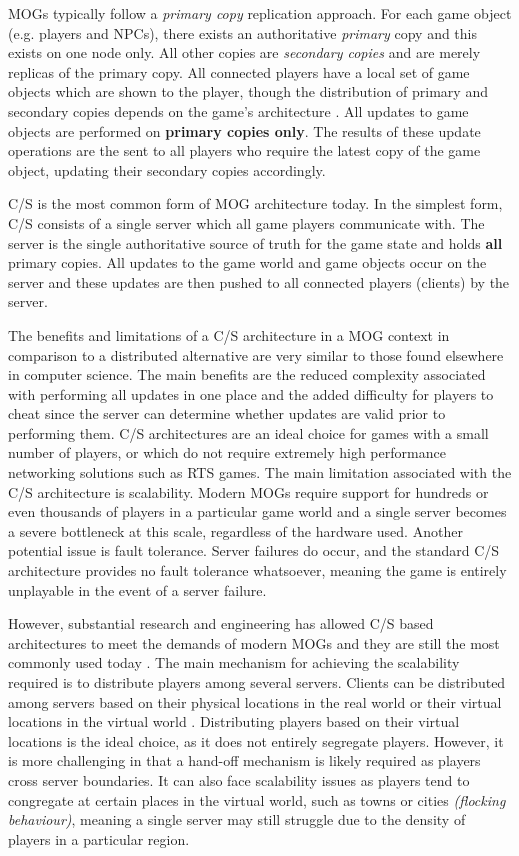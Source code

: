 MOGs typically follow a \textit{primary copy} replication approach. For each game object (e.g. players and NPCs), there exists an authoritative \textit{primary} copy and this exists on one node only. All other copies are \textit{secondary copies} and are merely replicas of the primary copy. All connected players have a local set of game objects which are shown to the player, though the distribution of primary and secondary copies depends on the game's architecture \cite{p2p-mog-survey}. All updates to game objects are performed on \textbf{primary copies only}. The results of these update operations are the sent to all players who require the latest copy of the game object, updating their secondary copies accordingly.

C/S is the most common form of MOG architecture today. In the simplest form, C/S consists of a single server which all game players communicate with. The server is the single authoritative source of truth for the game state and holds \textbf{all} primary copies. All updates to the game world and game objects occur on the server and these updates are then pushed to all connected players (clients) by the server.

The benefits and limitations of a C/S architecture in a MOG context in comparison to a distributed alternative are very similar to those found elsewhere in computer science. The main benefits are the reduced complexity associated with performing all updates in one place and the added difficulty for players to cheat since the server can determine whether updates are valid prior to performing them. C/S architectures are an ideal choice for games with a small number of players, or which do not require extremely high performance networking solutions such as RTS games. The main limitation associated with the C/S architecture is scalability. Modern MOGs require support for hundreds or even thousands of players in a particular game world and a single server becomes a severe bottleneck at this scale, regardless of the hardware used. Another potential issue is fault tolerance. Server failures do occur, and the standard C/S architecture provides no fault tolerance whatsoever, meaning the game is entirely unplayable in the event of a server failure.

However, substantial research and engineering has allowed C/S based architectures to meet the demands of modern MOGs and they are still the most commonly used today \cite{p2p-mog-survey}. The main mechanism for achieving the scalability required is to distribute players among several servers. Clients can be distributed among servers based on their physical locations in the real world or their virtual locations in the virtual world \cite{dist-mog-loadsharing}. Distributing players based on their virtual locations is the ideal choice, as it does not entirely segregate players. However, it is more challenging in that a hand-off mechanism is likely required as players cross server boundaries. It can also face scalability issues as players tend to congregate at certain places in the virtual world, such as towns or cities \textit{(flocking behaviour)}, meaning a single server may still struggle due to the density of players in a particular region. 

